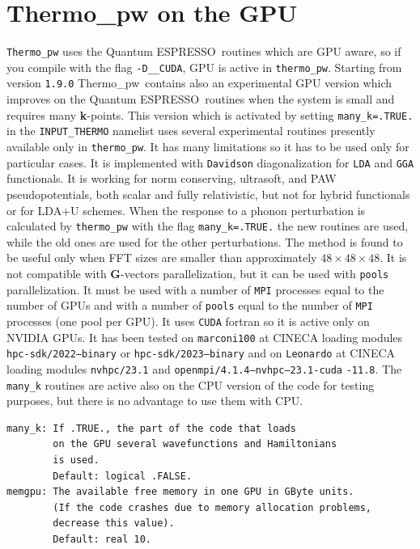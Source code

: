 \documentclass[12pt,a4paper,twoside]{report}
\def\qe{{\sc Quantum ESPRESSO}}
\def\thermo{{\sc Thermo}\_{\sc pw}}
\begin{document}
\newpage
{\color{dark-blue}\chapter{Thermo\_pw on the GPU}}
\color{black}
\texttt{Thermo\_pw} uses the \qe\ routines which are GPU aware, so if 
you compile with the flag \texttt{-D\_\_CUDA}, GPU is active in
\texttt{thermo\_pw}. Starting from version \texttt{1.9.0} \thermo\ contains
also an experimental GPU version which improves on 
the \qe\ routines when the system is small and requires many
{\bf k}-points. This version which is activated by setting 
\texttt{many\_k=.TRUE.} in the \texttt{INPUT\_THERMO} namelist
uses several experimental routines presently available only 
in \texttt{thermo\_pw}. It has many limitations so it has to be used 
only for particular cases. It is implemented with \texttt{Davidson} 
diagonalization for \texttt{LDA} and \texttt{GGA} functionals. It
is working for norm conserving, ultrasoft, and PAW pseudopotentials,
both scalar and fully relativistic, but not for hybrid functionals or
for LDA+U schemes. When the response to a phonon
perturbation is calculated by \texttt{thermo\_pw} with the 
flag \texttt{many\_k=.TRUE.} the new routines are used, while
the old ones are used for the other perturbations. 
The method is found to be useful only when FFT sizes are smaller than
approximately ${48\times 48 \times 48}$. It is not compatible with
{\bf G}-vectors parallelization, but it can be used with \texttt{pools} 
parallelization. It must be used with a number of 
\texttt{MPI} processes equal to the number of GPUs and with a number
of \texttt{pools} equal to the number of \texttt{MPI} processes (one pool per
GPU). It uses \texttt{CUDA} fortran so it is active only
on NVIDIA GPUs. It has been tested on \texttt{marconi100} 
at CINECA loading modules \texttt{hpc-sdk/2022--binary} or 
\texttt{hpc-sdk/2023--binary} and on \texttt{Leonardo} at CINECA loading
modules \texttt{nvhpc/23.1} and \texttt{openmpi/4.1.4--nvhpc--23.1-cuda}
 \texttt{-11.8}.
The \texttt{many\_k} routines are active also on the CPU version of the code
for testing purposes, but there is no advantage to use them with CPU.\\
\begin{verbatim}
many_k: If .TRUE., the part of the code that loads 
        on the GPU several wavefunctions and Hamiltonians 
        is used. 
        Default: logical .FALSE.
memgpu: The available free memory in one GPU in GByte units.
        (If the code crashes due to memory allocation problems, 
        decrease this value). 
        Default: real 10.
\end{verbatim}
\end{document}
